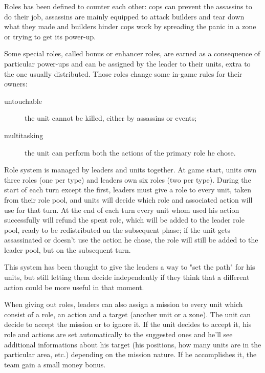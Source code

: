 			Roles has been defined to counter each other: cops can prevent the assassins to do their job, assassins are mainly equipped to attack builders and tear down what they made and builders hinder cops work by spreading the panic in a zone or trying to get its power-up.
			
			Some special roles, called bonus or enhancer roles, are earned as a consequence of particular power-ups and can be assigned by the leader to their units, extra to the one usually distributed.
			Those roles change some in-game rules for their owners:
			\begin{description}
				\item[untouchable] the unit cannot be killed, either by assassins or events;
				\item[multitasking] the unit can perform both the actions of the primary role he chose.
			\end{description} 
			
			Role system is managed by leaders and units together.
			At game start, units own three roles (one per type) and leaders own six roles (two per type).
			During the start of each turn except the first, leaders must give a role to every unit, taken from their role pool, and units will decide which role and associated action will use for that turn.
			At the end of each turn every unit whom used his action successfully will refund the spent role, which will be added to the leader role pool, ready to be redistributed on the subsequent phase; if the unit gets assassinated or doesn't use the action he chose, the role will still be added to the leader pool, but on the subsequent turn.
			
			This system has been thought to give the leaders a way to "set the path" for his units, but still letting them decide independently if they think that a different action could be more useful in that moment.
		
			
			When giving out roles, leaders can also assign a mission to every unit which consist of a role, an action and a target (another unit or a zone).
			The unit can decide to accept the mission or to ignore it. If the unit decides to accept it, his role and actions are set automatically to the suggested ones and he'll see additional informations about his target (his positions, how many units are in the particular area, etc.) depending on the mission nature. If he accomplishes it, the team gain a small money bonus.
			
